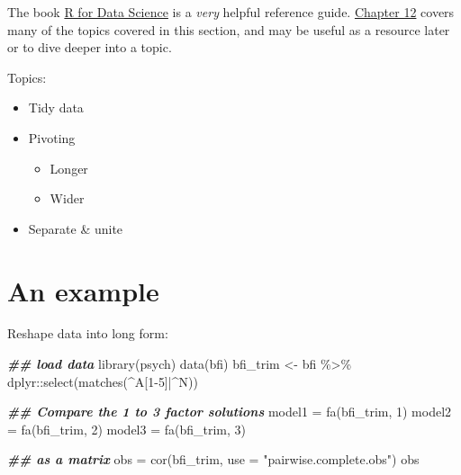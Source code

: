 \documentclass[
]{book}
\newenvironment{Shaded}{\begin{snugshade}}{\end{snugshade}}
\newcommand{\AttributeTok}[1]{\textcolor[rgb]{0.77,0.63,0.00}{#1}}
\newcommand{\DecValTok}[1]{\textcolor[rgb]{0.00,0.00,0.81}{#1}}
\newcommand{\DocumentationTok}[1]{\textcolor[rgb]{0.56,0.35,0.01}{\textbf{\textit{#1}}}}
\newcommand{\FunctionTok}[1]{\textcolor[rgb]{0.00,0.00,0.00}{#1}}
\newcommand{\NormalTok}[1]{#1}
\newcommand{\OtherTok}[1]{\textcolor[rgb]{0.56,0.35,0.01}{#1}}
\newcommand{\SpecialCharTok}[1]{\textcolor[rgb]{0.00,0.00,0.00}{#1}}
\newcommand{\StringTok}[1]{\textcolor[rgb]{0.31,0.60,0.02}{#1}}
\providecommand{\tightlist}{%
  \setlength{\itemsep}{0pt}\setlength{\parskip}{0pt}}
\begin{document}
The book \href{https://r4ds.had.co.nz/}{R for Data Science} is a \emph{very} helpful reference guide. \href{https://r4ds.had.co.nz/tidy-data.html}{Chapter 12} covers many of the topics covered in this section, and may be useful as a resource later or to dive deeper into a topic.

Topics:

\begin{itemize}
\tightlist
\item
  Tidy data
\item
  Pivoting

  \begin{itemize}
  \tightlist
  \item
    Longer
  \item
    Wider
  \end{itemize}
\item
  Separate \& unite
\end{itemize}

\hypertarget{an-example-2}{%
\section{An example}\label{an-example-2}}

Reshape data into long form:

\begin{Shaded}
\begin{Highlighting}[]
\DocumentationTok{\#\# load data}
\FunctionTok{library}\NormalTok{(psych)}
\FunctionTok{data}\NormalTok{(bfi)}
\NormalTok{bfi\_trim }\OtherTok{\textless{}{-}}\NormalTok{ bfi }\SpecialCharTok{\%\textgreater{}\%} 
\NormalTok{  dplyr}\SpecialCharTok{::}\FunctionTok{select}\NormalTok{(}\FunctionTok{matches}\NormalTok{(}\StringTok{\textquotesingle{}\^{}A[1{-}5]|\^{}N\textquotesingle{}}\NormalTok{))}

\DocumentationTok{\#\# Compare the 1 to 3 factor solutions}
\NormalTok{model1 }\OtherTok{=} \FunctionTok{fa}\NormalTok{(bfi\_trim, }\DecValTok{1}\NormalTok{)}
\NormalTok{model2 }\OtherTok{=} \FunctionTok{fa}\NormalTok{(bfi\_trim, }\DecValTok{2}\NormalTok{)}
\NormalTok{model3 }\OtherTok{=} \FunctionTok{fa}\NormalTok{(bfi\_trim, }\DecValTok{3}\NormalTok{)}

\DocumentationTok{\#\# as a matrix}
\NormalTok{obs }\OtherTok{=} \FunctionTok{cor}\NormalTok{(bfi\_trim, }\AttributeTok{use =} \StringTok{"pairwise.complete.obs"}\NormalTok{) }
\NormalTok{obs}
\end{Highlighting}
\end{Shaded}
\end{document}
